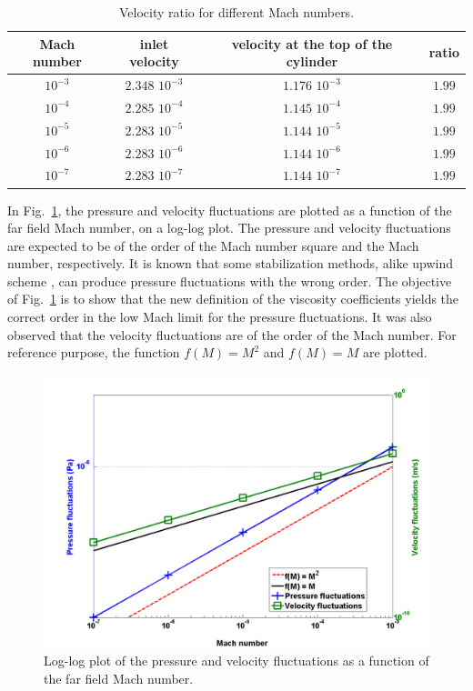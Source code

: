 \documentclass[preprint,10pt]{elsarticle}
\newcommand{\fig}[1]{Fig.~\ref{#1}}                      %
\begin{document}
\begin{table}[H]
\begin{center}
 \caption{\label{tbl:velocity_ratio}Velocity ratio for different Mach numbers.}
\begin{tabular}{|c|c|c|c|}
\hline
Mach number & inlet velocity & velocity at the top of the cylinder & ratio \\ \hline
$10^{-3}$ & $2.348$ $10^{-3}$ & $1.176$ $10^{-3}$& $1.99$  \\ \hline
$10^{-4}$ & $2.285$ $10^{-4}$ & $1.145$ $10^{-4}$& $1.99$  \\ \hline
$10^{-5}$ & $2.283$ $10^{-5}$ & $1.144$ $10^{-5}$ & $1.99$ \\ \hline
$10^{-6}$ & $2.283$ $10^{-6}$ & $1.144$ $10^{-6}$ & $1.99$ \\ \hline
$10^{-7}$ & $2.283$ $10^{-7}$ & $1.144$ $10^{-7}$ & $1.99$ \\ \hline
\end{tabular}
\end{center}
\nonumber
\end{table}
%
In \fig{fig:pressure_vel_fluc}, the pressure and velocity fluctuations are plotted as a function of the far field Mach number, on a log-log plot. The pressure and velocity fluctuations are expected to be of the order of the Mach number square and the Mach number, respectively. It is known that some stabilization methods, alike upwind scheme \cite{guillard}, can produce pressure fluctuations with the wrong order. The objective of \fig{fig:pressure_vel_fluc} is to show that the new definition of the viscosity coefficients yields the correct order in the low Mach limit for the pressure fluctuations. It was also observed that the velocity fluctuations are of the order of the Mach number. For reference purpose, the function $f(M) = M^2$ and $f(M)=M$ are plotted.  
%
\begin{figure}[H]
\centering
\includegraphics[width=\textwidth]{pressure_fluctuation.png}
\caption{Log-log plot of the pressure and velocity fluctuations as a function of the far field Mach number.}
\label{fig:pressure_vel_fluc}
\end{figure}
\end{document}
